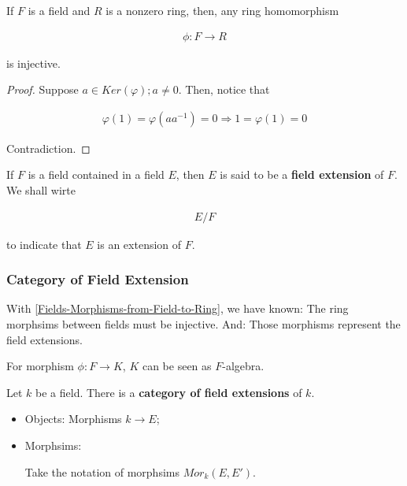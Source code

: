 \documentclass[Total.tex]{subfiles}
\begin{document}
				\begin{lemma}
					
					\label{Fields-Morphisms-from-Field-to-Ring}
					If $F$ is a field and $R$ is a nonzero ring, then, any ring homomorphism
					
					\begin{gather*}
						\phi:F\rightarrow R
					\end{gather*}
					
					is injective.
				\end{lemma}
				
				\begin{proof}
					Suppose $a\in Ker(\varphi);a\not=0$. Then, notice that
					
					\begin{gather*}
						\varphi(1)=\varphi(aa^{-1})=0\Rightarrow 1=\varphi(1)=0
					\end{gather*}
					
					Contradiction. 
				\end{proof}
				
				\begin{Def}
					If $F$ is a field contained in a field $E$, then $E$ is said to be a \textbf{field extension} of $F$. We shall wirte 
					
					\begin{gather*}
						E/F
					\end{gather*}
					
					to indicate that $E$ is an extension of $F$.
				\end{Def}
				
				
				\subsubsection{Category of Field Extension}
				
				With \ref{Fields-Morphisms-from-Field-to-Ring}, we have known: The ring morphsims between fields must be injective. And: Those morphisms represent the field extensions. 
				
				For morphism $\phi:F\rightarrow K$, $K$ can be seen as $F$-algebra.
				
				\begin{Def}
					Let $k$ be a field. There is a \textbf{category of field extensions} of $k$. 
					
					\begin{itemize}
						\item Objects: Morphisms $k\rightarrow E$;
						\item Morphsims: 
						
						Take the notation of morphsims $Mor_k(E,E')$.
					\end{itemize}
				\end{Def}
				
\end{document}

